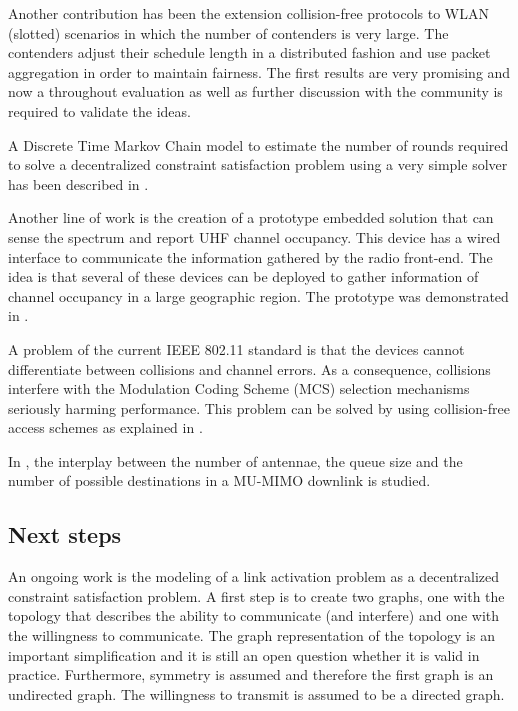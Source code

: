 \documentclass[a4paper,twocolumns]{article}%
\begin{document}
Another contribution has been the extension collision-free protocols to WLAN (slotted) scenarios in which the number of contenders is very large.
The contenders adjust their schedule length in a distributed fashion and use packet aggregation in order to maintain fairness.
The first results are very promising \cite{sanabria2013fec} and now a throughout evaluation as well as further discussion with the community is required to validate the ideas.

A Discrete Time Markov Chain model to estimate the number of rounds required to solve a decentralized constraint satisfaction problem using a very simple solver has been described in \cite{barcelo2012mdc}.

Another line of work is the creation of a prototype embedded solution that can sense the spectrum and report UHF channel occupancy.
This device has a wired interface to communicate the information gathered by the radio front-end.
The idea is that several of these devices can be deployed to gather information of channel occupancy in a large geographic region.
The prototype was demonstrated in \cite{sanabria2012ssu}.

A problem of the current IEEE 802.11 standard is that the devices cannot differentiate between collisions and channel errors.
As a consequence, collisions interfere with the Modulation Coding Scheme (MCS) selection mechanisms seriously harming performance.
This problem can be solved by using collision-free access schemes as explained in \cite{martorell2012pec}.

In \cite{bellalta2012ppa, bellalta2012rqp}, the interplay between the number of antennae, the queue size and the number of possible destinations in a MU-MIMO downlink is studied.


\subsection{Next steps}


An ongoing work is the modeling of a link activation problem as a decentralized constraint satisfaction problem.
A first step is to create two graphs, one with the topology that describes the ability to communicate (and interfere) and one with the willingness to communicate.
The graph representation of the topology is an important simplification and it is still an open question whether it is valid in practice.
Furthermore, symmetry is assumed and therefore the first graph is an undirected graph.
The willingness to transmit is assumed to be a directed graph.
\end{document}

